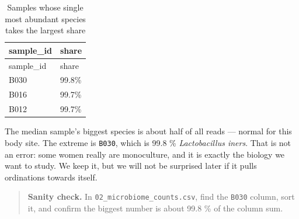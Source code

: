 \documentclass[
  letterpaper,
  DIV=11,
  numbers=noendperiod]{scrartcl}
\newenvironment{Shaded}{\begin{snugshade}}{\end{snugshade}}
\newcommand{\AttributeTok}[1]{\textcolor[rgb]{0.40,0.45,0.13}{#1}}
\newcommand{\ControlFlowTok}[1]{\textcolor[rgb]{0.00,0.23,0.31}{\textbf{#1}}}
\newcommand{\DecValTok}[1]{\textcolor[rgb]{0.68,0.00,0.00}{#1}}
\newcommand{\FunctionTok}[1]{\textcolor[rgb]{0.28,0.35,0.67}{#1}}
\newcommand{\NormalTok}[1]{\textcolor[rgb]{0.00,0.23,0.31}{#1}}
\newcommand{\OtherTok}[1]{\textcolor[rgb]{0.00,0.23,0.31}{#1}}
\newcommand{\SpecialCharTok}[1]{\textcolor[rgb]{0.37,0.37,0.37}{#1}}
\newcommand{\StringTok}[1]{\textcolor[rgb]{0.13,0.47,0.30}{#1}}
\begin{document}
\begin{Shaded}
\end{Shaded}

\begin{longtable}[]{@{}ll@{}}
\caption{Samples whose single most abundant species takes the largest
share}\tabularnewline
\toprule\noalign{}
sample\_id & share \\
\midrule\noalign{}
\endfirsthead
\toprule\noalign{}
sample\_id & share \\
\midrule\noalign{}
\endhead
\bottomrule\noalign{}
\endlastfoot
B030 & 99.8\% \\
B016 & 99.7\% \\
B012 & 99.7\% \\
\end{longtable}

The median sample's biggest species is about half of all reads ---
normal for this body site. The extreme is \texttt{B030}, which is 99.8
\% \emph{Lactobacillus iners}. That is not an error: some women really
are monoculture, and it is exactly the biology we want to study. We keep
it, but we will not be surprised later if it pulls ordinations towards
itself.

\begin{quote}
\textbf{Sanity check.} In \texttt{02\_microbiome\_counts.csv}, find the
\texttt{B030} column, sort it, and confirm the biggest number is about
99.8 \% of the column sum.
\end{quote}
\end{document}
